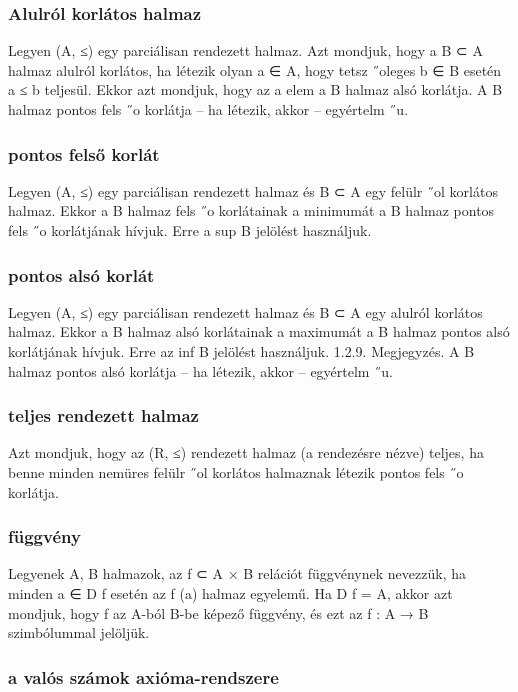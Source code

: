\documentclass[12pt]{article}
\begin{document}
\subsubsection{Alulról korlátos halmaz}

Legyen (A, ≤) egy parciálisan rendezett halmaz. Azt mondjuk, hogy a B ⊂ A halmaz
alulról korlátos, ha létezik olyan a ∈ A, hogy tetsz ˝oleges b ∈ B esetén a ≤ b teljesül. Ekkor azt mondjuk,
hogy az a elem a B halmaz alsó korlátja.
A B halmaz pontos fels ˝o korlátja – ha létezik, akkor – egyértelm ˝u.

\subsubsection{pontos felső korlát}

Legyen (A, ≤) egy parciálisan rendezett halmaz és B ⊂ A egy felülr ˝ol korlátos halmaz.
Ekkor a B halmaz fels ˝o korlátainak a minimumát a B halmaz pontos fels ˝o korlátjának hívjuk. Erre a
sup B jelölést használjuk.

\subsubsection{pontos alsó korlát}

Legyen (A, ≤) egy parciálisan rendezett halmaz és B ⊂ A egy alulról korlátos halmaz.
Ekkor a B halmaz alsó korlátainak a maximumát a B halmaz pontos alsó korlátjának hívjuk. Erre az
inf B jelölést használjuk.
1.2.9. Megjegyzés. A B halmaz pontos alsó korlátja – ha létezik, akkor – egyértelm ˝u.

\subsubsection{teljes rendezett halmaz}

Azt mondjuk, hogy az (R, ≤) rendezett halmaz (a rendezésre nézve) teljes, ha benne
minden nemüres felülr ˝ol korlátos halmaznak létezik pontos fels ˝o korlátja.

\subsubsection{függvény}

Legyenek A, B halmazok, az f ⊂ A × B relációt függvénynek nevezzük, ha minden a ∈ D f esetén az f ({a})
halmaz egyelemű. Ha D f = A, akkor azt mondjuk, hogy f az A-ból B-be képező függvény, és ezt az f : A → B
szimbólummal jelöljük.

\subsubsection{a valós számok axióma-rendszere}
\end{document}
